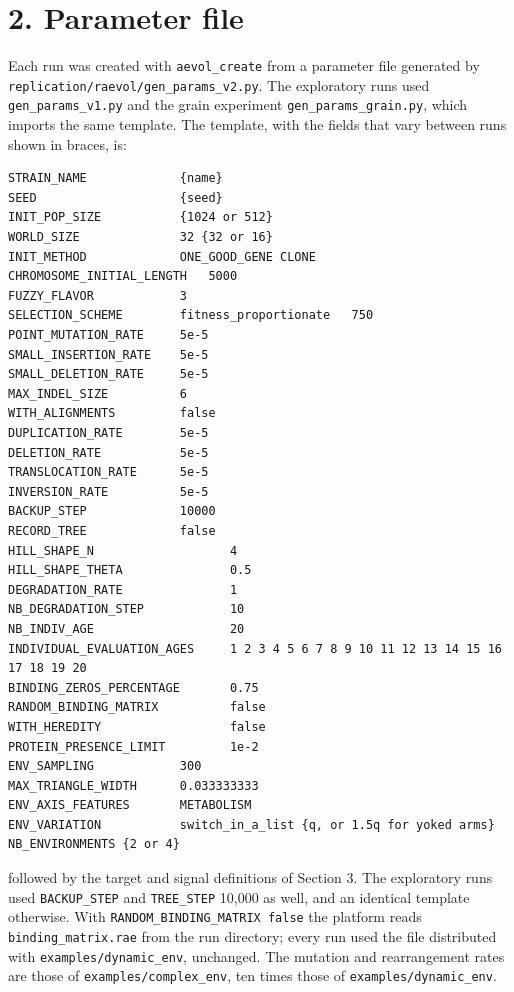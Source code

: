 \section*{2. Parameter file}
Each run was created with \texttt{aevol\_create} from a parameter file generated
by \texttt{replication/raevol/gen\_params\_v2.py}. The exploratory runs used \texttt{gen\_params\_v1.py} and the grain experiment \texttt{gen\_params\_grain.py}, which imports the same template. The template, with the fields that vary between runs
shown in braces, is:
\begin{lstlisting}
STRAIN_NAME             {name}
SEED                    {seed}
INIT_POP_SIZE           {1024 or 512}
WORLD_SIZE              32 {32 or 16}
INIT_METHOD             ONE_GOOD_GENE CLONE
CHROMOSOME_INITIAL_LENGTH   5000
FUZZY_FLAVOR            3
SELECTION_SCHEME        fitness_proportionate   750
POINT_MUTATION_RATE     5e-5
SMALL_INSERTION_RATE    5e-5
SMALL_DELETION_RATE     5e-5
MAX_INDEL_SIZE          6
WITH_ALIGNMENTS         false
DUPLICATION_RATE        5e-5
DELETION_RATE           5e-5
TRANSLOCATION_RATE      5e-5
INVERSION_RATE          5e-5
BACKUP_STEP             10000
RECORD_TREE             false
HILL_SHAPE_N                   4
HILL_SHAPE_THETA               0.5
DEGRADATION_RATE               1
NB_DEGRADATION_STEP            10
NB_INDIV_AGE                   20
INDIVIDUAL_EVALUATION_AGES     1 2 3 4 5 6 7 8 9 10 11 12 13 14 15 16 17 18 19 20
BINDING_ZEROS_PERCENTAGE       0.75
RANDOM_BINDING_MATRIX          false
WITH_HEREDITY                  false
PROTEIN_PRESENCE_LIMIT         1e-2
ENV_SAMPLING            300
MAX_TRIANGLE_WIDTH      0.033333333
ENV_AXIS_FEATURES       METABOLISM
ENV_VARIATION           switch_in_a_list {q, or 1.5q for yoked arms}
NB_ENVIRONMENTS {2 or 4}
\end{lstlisting}
followed by the target and signal definitions of Section 3. The exploratory runs
used \texttt{BACKUP\_STEP} and \texttt{TREE\_STEP} 10{,}000 as well, and an identical
template otherwise. With \texttt{RANDOM\_BINDING\_MATRIX false} the platform reads
\texttt{binding\_matrix.rae} from the run directory; every run used the file
distributed with \texttt{examples/dynamic\_env}, unchanged. The mutation and
rearrangement rates are those of \texttt{examples/complex\_env}, ten times those of
\texttt{examples/dynamic\_env}.

